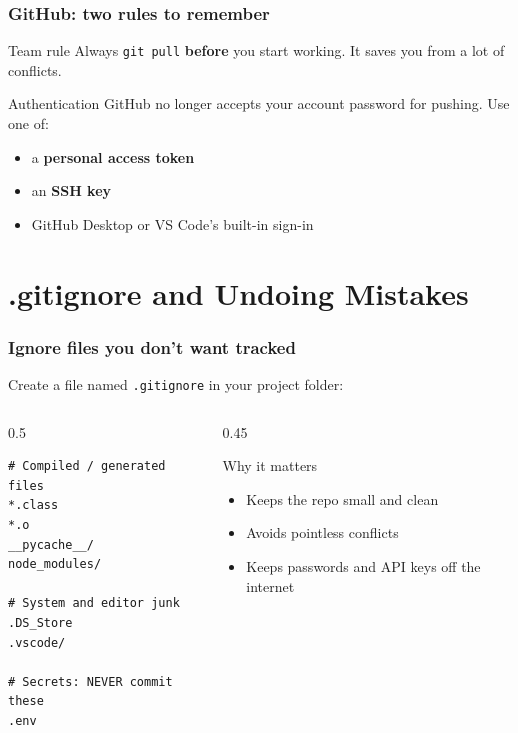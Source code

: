\documentclass[aspectratio=169,10pt,compress]{beamer}
\newcommand{\cmd}[1]{\texttt{\color{gitred}#1}}
\begin{document}
\begin{frame}[t,fragile] \frametitle{GitHub: two rules to remember}
  \begin{alertblock}{Team rule}
    Always \cmd{git pull} \textbf{before} you start working.
    It saves you from a lot of conflicts.
  \end{alertblock}

  \vspace{1em}
  \begin{block}{Authentication}
    GitHub no longer accepts your account password for pushing. Use one of:
    \begin{itemize}
      \item a \textbf{personal access token}
      \item an \textbf{SSH key}
      \item GitHub Desktop or VS Code's built-in sign-in
    \end{itemize}
  \end{block}
\end{frame}

\section[Undo]{.gitignore and Undoing Mistakes}

\begin{frame}[t,fragile] \frametitle{Ignore files you don't want tracked}
  Create a file named \texttt{.gitignore} in your project folder:

  \begin{columns}[T]
    \begin{column}{0.5\textwidth}
\begin{lstlisting}[language={}]
# Compiled / generated files
*.class
*.o
__pycache__/
node_modules/

# System and editor junk
.DS_Store
.vscode/

# Secrets: NEVER commit these
.env
\end{lstlisting}
    \end{column}
    \begin{column}{0.45\textwidth}
      \begin{alertblock}{Why it matters}
        \begin{itemize}
          \item Keeps the repo small and clean
          \item Avoids pointless conflicts
          \item Keeps passwords and API keys off the internet
        \end{itemize}
      \end{alertblock}
    \end{column}
  \end{columns}
\end{frame}
\end{document}
